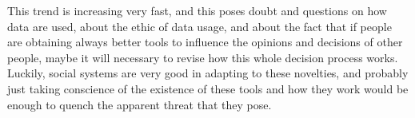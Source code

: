 \documentclass[11pt,a4paper,twocolumn]{article}
\begin{document}
This trend is increasing very fast, and this poses doubt and questions on how data are used, about the ethic of data usage, and about the fact that if people are obtaining always better tools to influence the opinions and decisions of other people, maybe it will necessary to revise how this whole decision process works.
Luckily, social systems are very good in adapting to these novelties, and probably just taking conscience of the existence of these tools and how they work would be enough to quench the apparent threat that they pose. 



\end{document}
